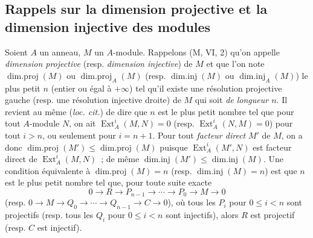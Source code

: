 \subsection{Rappels sur la dimension projective et la dimension injective des
modules}
\label{subsection:0.17.2-fr}

\begin{env}[17.2.1]
\label{0.17.2.1-fr}
Soient $A$ un anneau, $M$ un $A$-module. Rappelons (M, VI, 2) qu'on appelle
\emph{dimension projective} (resp. \emph{dimension injective}) de $M$ et que
l'on note $\operatorname{dim.proj}(M)$ ou
$\operatorname{dim.proj}_A(M)$ (resp. $\operatorname{dim.inj}(M)$ ou
$\operatorname{dim.inj}_A(M)$) le plus petit $n$ (entier ou égal à $+\infty$)
tel qu'il existe une résolution projective gauche (resp. une résolution
injective droite) de $M$ qui soit \emph{de longueur $n$}. Il revient au même
(\emph{loc. cit.}) de dire que $n$ est le plus petit nombre tel que pour tout
$A$-module $N$, on ait $\operatorname{Ext}^i_A(M,N)=0$ (resp.
$\operatorname{Ext}^i_A(N,M)=0$) pour tout $i>n$, ou seulement pour $i=n+1$.
Pour tout \emph{facteur direct} $M'$ de $M$, on a donc
$\operatorname{dim.proj}(M')\leq\operatorname{dim.proj}(M)$ puisque
$\operatorname{Ext}^i_A(M',N)$ est facteur direct de
$\operatorname{Ext}^i_A(M,N)$~; de même
$\operatorname{dim.inj}(M')\leq\operatorname{dim.inj}(M)$. Une condition
équivalente à $\operatorname{dim.proj}(M)=n$ (resp.
$\operatorname{dim.inj}(M)=n$) est que $n$ est le plus petit nombre tel que,
pour toute suite exacte
\[
  0\longrightarrow R\longrightarrow P_{n-1}\longrightarrow\cdots
  \longrightarrow P_0\longrightarrow M\longrightarrow0
\]
(resp.
$0\longrightarrow M\longrightarrow Q_0\longrightarrow\cdots
\longrightarrow Q_{n-1}\longrightarrow C\longrightarrow0$), où tous les
$P_i$ pour $0\leq i<n$ sont projectifs (resp. tous les $Q_i$ pour $0\leq i<n$
sont injectifs), alors $R$ est projectif (resp. $C$ est injectif).
\end{env}

